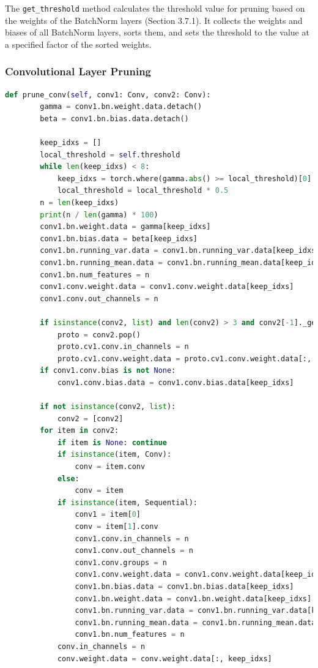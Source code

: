 The \texttt{get\_threshold} method calculates the threshold value for pruning based on the weights of the BatchNorm layers (Section 3.7.1). It collects the weights and biases of all BatchNorm layers, sorts them, and sets the threshold to the value at a specified factor of the sorted weights.

\subsubsection{Convolutional Layer Pruning}

\begin{lstlisting}[language=Python]
    def prune_conv(self, conv1: Conv, conv2: Conv):
        gamma = conv1.bn.weight.data.detach()
        beta = conv1.bn.bias.data.detach()

        keep_idxs = []
        local_threshold = self.threshold
        while len(keep_idxs) < 8:
            keep_idxs = torch.where(gamma.abs() >= local_threshold)[0]
            local_threshold = local_threshold * 0.5
        n = len(keep_idxs)
        print(n / len(gamma) * 100)
        conv1.bn.weight.data = gamma[keep_idxs]
        conv1.bn.bias.data = beta[keep_idxs]
        conv1.bn.running_var.data = conv1.bn.running_var.data[keep_idxs]
        conv1.bn.running_mean.data = conv1.bn.running_mean.data[keep_idxs]
        conv1.bn.num_features = n
        conv1.conv.weight.data = conv1.conv.weight.data[keep_idxs]
        conv1.conv.out_channels = n

        if isinstance(conv2, list) and len(conv2) > 3 and conv2[-1]._get_name() == "Proto":
            proto = conv2.pop()
            proto.cv1.conv.in_channels = n
            proto.cv1.conv.weight.data = proto.cv1.conv.weight.data[:, keep_idxs]
        if conv1.conv.bias is not None:
            conv1.conv.bias.data = conv1.conv.bias.data[keep_idxs]

        if not isinstance(conv2, list):
            conv2 = [conv2]
        for item in conv2:
            if item is None: continue
            if isinstance(item, Conv):
                conv = item.conv
            else:
                conv = item
            if isinstance(item, Sequential):
                conv1 = item[0]
                conv = item[1].conv
                conv1.conv.in_channels = n
                conv1.conv.out_channels = n
                conv1.conv.groups = n
                conv1.conv.weight.data = conv1.conv.weight.data[keep_idxs, :]
                conv1.bn.bias.data = conv1.bn.bias.data[keep_idxs]
                conv1.bn.weight.data = conv1.bn.weight.data[keep_idxs]
                conv1.bn.running_var.data = conv1.bn.running_var.data[keep_idxs]
                conv1.bn.running_mean.data = conv1.bn.running_mean.data[keep_idxs]
                conv1.bn.num_features = n
            conv.in_channels = n
            conv.weight.data = conv.weight.data[:, keep_idxs]
\end{lstlisting}


